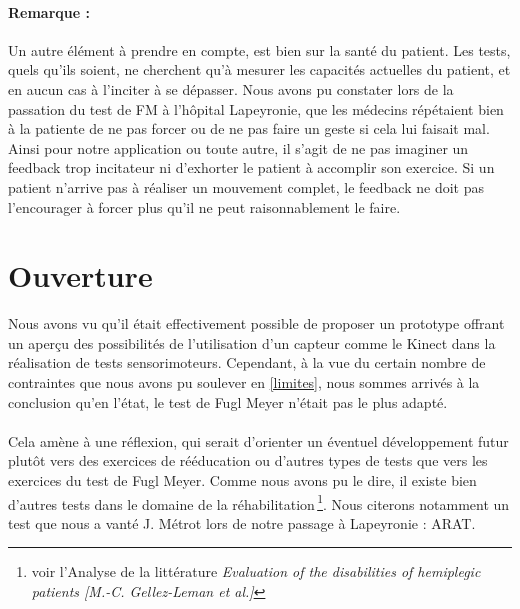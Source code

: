 \documentclass[french,12pt]{report}
\begin{document}
\paragraph{Remarque :\\}
Un autre élément à prendre en compte, est bien sur la santé du patient. Les tests, quels qu'ils soient, ne cherchent qu'à mesurer
les capacités actuelles du patient, et en aucun cas à l'inciter à se dépasser. Nous avons pu constater lors de la passation
du test de FM à l'hôpital Lapeyronie, que les médecins répétaient bien à la patiente de ne pas forcer ou de ne pas faire un geste
si cela lui faisait mal.\\
Ainsi pour notre application ou toute autre, il s'agit de ne pas imaginer un feedback trop incitateur ni d'exhorter le patient à 
accomplir son exercice. Si un patient n'arrive pas à réaliser un mouvement complet, le feedback ne doit pas l'encourager à forcer plus qu’il ne peut raisonnablement le faire.
		
		\section{Ouverture}
Nous avons vu %
 qu'il était effectivement possible de proposer un prototype offrant un aperçu des possibilités de l'utilisation d'un capteur comme le Kinect dans la réalisation de tests sensorimoteurs. Cependant, à la vue du certain nombre de contraintes que nous avons pu soulever en \ref{limites}, nous sommes arrivés à la conclusion qu'en l'état, le test de Fugl Meyer n'était pas le plus adapté. 

\paragraph{}
Cela amène à une réflexion, qui serait d'orienter un éventuel développement futur plutôt vers des exercices de rééducation ou d'autres types de tests que vers les exercices du test de Fugl Meyer. Comme nous avons pu le dire, il existe bien d'autres tests 
dans le domaine de la réhabilitation\,\footnote{voir l'Analyse de la littérature \textit{Evaluation of the disabilities of hemiplegic patients [M.-C. Gellez-Leman et al.]}}. Nous citerons notamment un test que nous a vanté J. Métrot lors de notre passage à 
Lapeyronie : ARAT.
\end{document}
